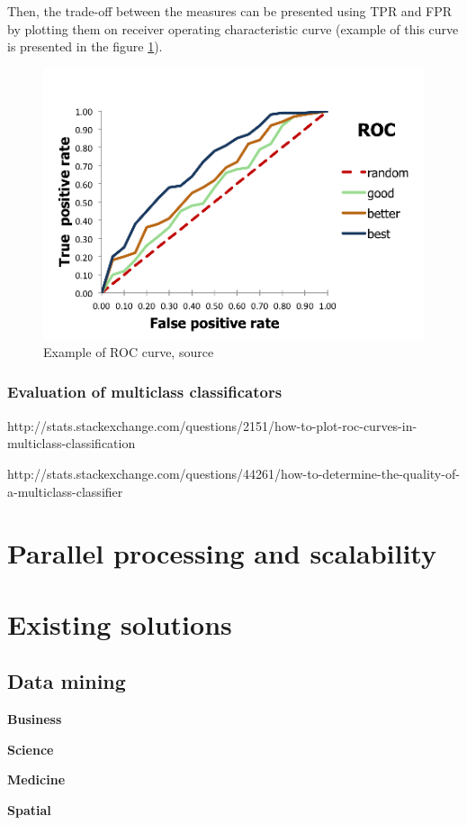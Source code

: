 Then, the trade-off between the measures can be presented using TPR and FPR by plotting them on receiver operating characteristic curve (example of this curve is presented in the figure \ref{roc-curve}).
\begin{figure}[H]
	\begin{center}
		\includegraphics[width=0.8\linewidth]{images/roc.png}
		\caption{Example of ROC curve, source \cite{roc-curve}}
		\label{roc-curve}
	\end{center}
\end{figure}
\subsubsection{Evaluation of multiclass classificators}


http://stats.stackexchange.com/questions/2151/how-to-plot-roc-curves-in-multiclass-classification


http://stats.stackexchange.com/questions/44261/how-to-determine-the-quality-of-a-multiclass-classifier
\section{Parallel processing and scalability}
\section{Existing solutions}
	\subsection{Data mining}
	\textbf{Business}
		
	\textbf{Science}
	
	\textbf{Medicine}
	
	\textbf{Spatial}
	
